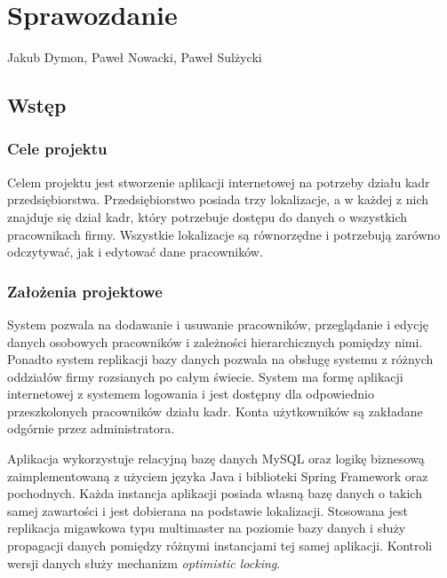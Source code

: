 \documentclass[]{article}
\date{}
\begin{document}
\hypertarget{header-n0}{%
\section{Sprawozdanie}\label{header-n0}}

Jakub Dymon, Paweł Nowacki, Paweł Sulżycki

\hypertarget{header-n4}{%
\subsection{Wstęp}\label{header-n4}}

\hypertarget{header-n5}{%
\subsubsection{Cele projektu}\label{header-n5}}

Celem projektu jest stworzenie aplikacji internetowej na potrzeby działu
kadr przedsiębiorstwa. Przedsiębiorstwo posiada trzy lokalizacje, a w
każdej z nich znajduje się dział kadr, który potrzebuje dostępu do
danych o wszystkich pracownikach firmy. Wszystkie lokalizacje są
równorzędne i potrzebują zarówno odczytywać, jak i edytować dane
pracowników.

\hypertarget{header-n8}{%
\subsubsection{Założenia projektowe}\label{header-n8}}

System pozwala na dodawanie i usuwanie pracowników, przeglądanie i
edycję danych osobowych pracowników i zależności hierarchicznych
pomiędzy nimi. Ponadto system replikacji bazy danych pozwala na obsługę
systemu z różnych oddziałów firmy rozsianych po całym świecie. System ma
formę aplikacji internetowej z systemem logowania i jest dostępny dla
odpowiednio przeszkolonych pracowników działu kadr. Konta użytkowników
są zakładane odgórnie przez administratora.

Aplikacja wykorzystuje relacyjną bazę danych MySQL oraz logikę biznesową
zaimplementowaną z użyciem języka Java i biblioteki Spring Framework
oraz pochodnych. Każda instancja aplikacji posiada własną bazę danych o
takich samej zawartości i jest dobierana na podstawie lokalizacji.
Stosowana jest replikacja migawkowa typu multimaster na poziomie bazy
danych i służy propagacji danych pomiędzy różnymi instancjami tej samej
aplikacji. Kontroli wersji danych służy mechanizm \emph{optimistic
locking}.
\end{document}
